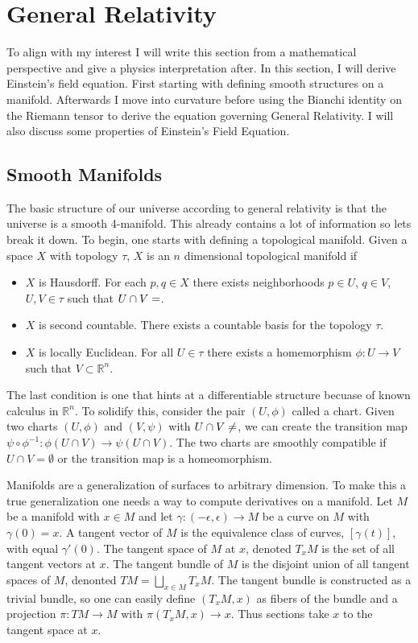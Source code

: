 \section{General Relativity}

To align with my interest I will write this section from a mathematical perspective and give a physics interpretation after. In this section, I will derive Einstein's field equation. First starting with defining smooth structures on a manifold. Afterwards I move into curvature before using the Bianchi identity on the Riemann tensor to derive the equation governing General Relativity. I will also discuss some properties of Einstein's Field Equation.
\subsection{Smooth Manifolds}
The basic structure of our universe according to general relativity is that the universe is a smooth 4-manifold. This already contains a lot of information so lets break it down.
To begin, one starts with defining a topological manifold. Given a space $X$ with topology $\tau$, $X$ is an $n$ dimensional topological manifold if
\begin{itemize}
	\item $X$ is Hausdorff. For each $p,q \in X$ there exists neighborhoods $p\in U$, $q\in V$, $U,V\in \tau$ such that $U \cap V = \empty$.
	\item $X$ is second countable. There exists a countable basis for the topology $\tau$.
	\item $X$ is locally Euclidean. For all $U\in\tau$ there exists a homemorphism $\phi:U\rightarrow V$ such that $V\subset \mathbb{R}^n$.
\end{itemize}
The last condition is one that hints at a differentiable structure becuase of known calculus in $\mathbb{R}^n$. To solidify this, consider the pair $(U,\phi)$ called a chart. Given two charts $(U,\phi)$ and $(V,\psi)$ with $U\cap V \neq \empty$, we can create the transition map $\psi \circ \phi^{-1}:\phi(U\cap V) \rightarrow \psi(U\cap V)$. The two charts are smoothly compatible if $U\cap V= \emptyset $ or the transition map is a homeomorphism.

Manifolds are a generalization of surfaces to arbitrary dimension. To make this a true generalization one needs a way to compute derivatives on a manifold. Let $M$ be a manifold with $x\in M$ and let $\gamma:(-\epsilon,\epsilon)\rightarrow M$ be a curve on $M$ with $\gamma(0)=x$. A tangent vector of $M$ is the equivalence class of curves, $[\gamma(t)]$, with equal $\gamma'(0)$. The tangent space of $M$ at $x$, denoted $T_xM$ is the set of all tangent vectors at $x$. The tangent bundle of $M$ is the disjoint union of all tangent spaces of $M$, denonted $TM = \bigsqcup\limits_{x\in M} T_xM$. The tangent bundle is constructed as a trivial bundle, so one can easily define $(T_xM,x)$ as fibers of the bundle and a projection $\pi:TM \rightarrow M$ with $\pi(T_xM,x)\rightarrow x$. Thus sections take $x$ to the tangent space at $x$.

